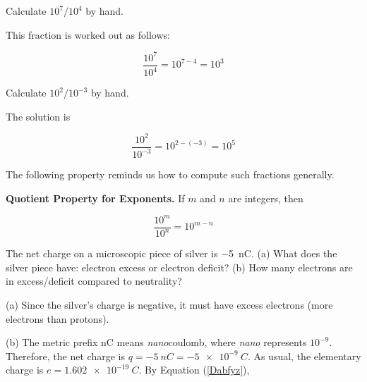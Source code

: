 \documentclass[main.tex]{subfiles}
\begin{document}
\begin{example}
    Calculate $10^7/10^4$ by hand.
\end{example}

\Solution This fraction is worked out as follows:

\begin{equation*}
    \frac{10^7}{10^4} = 10^{7-4} = 10^3
\end{equation*}

\begin{example}
    Calculate $10^2/10^{-3}$ by hand.
\end{example}

\Solution The solution is

\begin{equation*}
    \frac{10^2}{10^{-3}} = 10^{2 - (-3)} = 10^5
\end{equation*}

\cyanhrule
\vspace{1em}

The following property reminds us how to compute such fractions generally.

\begin{mdframed}[backgroundcolor=black!10]
    \textbf{Quotient Property for Exponents.} If $m$ and $n$ are integers, then

    \begin{equation} \label{6Kyqsn}
        \frac{10^m}{10^n} = 10^{m-n}
    \end{equation}
\end{mdframed}







\begin{example}
    The net charge on a microscopic piece of silver is \SI{-5}{nC}. (a) What does the silver piece have: electron excess or electron deficit? (b) How many electrons are in excess/deficit compared to neutrality?
\end{example}

\Solution (a) Since the silver's charge is negative, it must have excess electrons (more electrons than protons).

\vspace{1em}

(b) The metric prefix nC means \textit{nano}coulomb, where \textit{nano} represents $10^{-9}$. Therefore, the net charge is $q = \SI{-5}{nC} = \SI{-5e-9}{C}$. As usual, the elementary charge is $e= \SI{1.602e-19}{C}$. By Equation (\ref{Dabfyz}),
\end{document}

